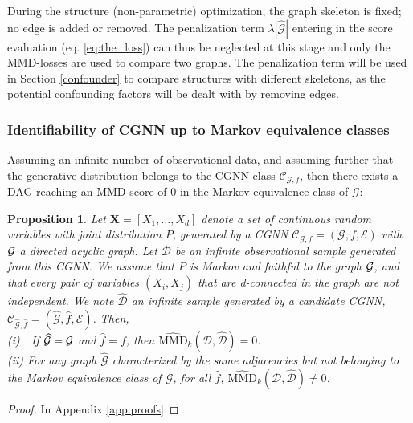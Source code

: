\documentclass[a4paper, 11pt]{article}
\newtheorem{prop}{Proposition}
\begin{document}
During the structure (non-parametric) optimization, the graph skeleton is fixed; no edge is added or removed. The penalization term $\lambda |\widehat{\mathcal{G}}|$ entering in the score evaluation (eq. \ref{eq:the_loss}) can thus be neglected at this stage and only the MMD-losses are used to compare two graphs. The penalization term will be used in Section \ref{confounder} to compare structures with different skeletons, as the potential confounding factors will be dealt with by removing edges.


\subsubsection{ Identifiability of CGNN up to Markov equivalence classes \label{sec:identif}}

Assuming an infinite number of observational data, and assuming further that the generative distribution belongs to the CGNN class $\mathcal{C}_{\mathcal{G},f}$, then there exists a DAG reaching an MMD score of 0 in the Markov equivalence class of $\mathcal{G}$:  

\begin{prop}\label{prop4}
Let $\textbf{X} = [X_1, \ldots, X_d]$ denote a set of continuous random variables with joint distribution $P$, generated by a CGNN $\mathcal{C}_{\mathcal{G},f} = (\mathcal{G}, f, \mathcal{E})$ with ${\cal G}$ a directed acyclic graph. Let $\mathcal{D}$ be an infinite observational sample generated from this CGNN. We assume that $P$ is Markov and faithful to the graph ${\cal G}$, and that every  pair of variables $(X_i,X_j)$ that are  d-connected in the graph are not independent. We note $\widehat{\mathcal{D}}$ an infinite sample generated by a candidate CGNN, $\mathcal{C}_{\widehat{\mathcal{G}},\hat{f}} = (\widehat{\mathcal{G}}, \hat{f}, \mathcal{E})$. Then, \\
(i)\ \ If $\widehat{\mathcal{G}} = {\cal G}$ and $\hat{f} = f$, then $\widehat{\text{MMD}}_k(\mathcal{D}, \widehat{\mathcal{D}}) = 0$.\\
(ii) For any  graph $\widehat{\mathcal{G}}$ characterized by the same adjacencies but not belonging to the Markov equivalence class of $\mathcal{G}$, for all $\hat{f}$, $\widehat{\text{MMD}}_k(\mathcal{D}, \widehat{\mathcal{D}}) \neq 0$.
\end{prop}

\begin{proof} 
In Appendix \ref{app:proofs}
\end{proof}
\end{document}
